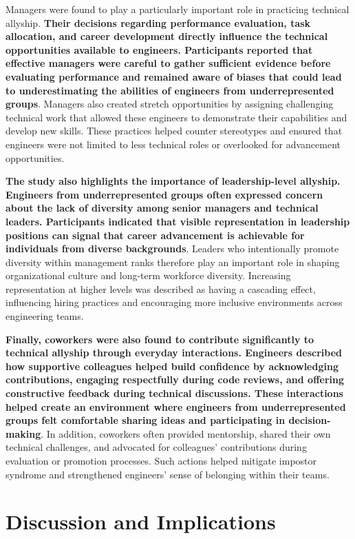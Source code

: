 Managers were found to play a particularly important role in practicing technical allyship. \textbf{Their decisions regarding performance evaluation, task allocation, and career development directly influence the technical opportunities available to engineers. Participants reported that effective managers were careful to gather sufficient evidence before evaluating performance and remained aware of biases that could lead to underestimating the abilities of engineers from underrepresented groups}. Managers also created stretch opportunities by assigning challenging technical work that allowed these engineers to demonstrate their capabilities and develop new skills. These practices helped counter stereotypes and ensured that engineers were not limited to less technical roles or overlooked for advancement opportunities.

\textbf{The study also highlights the importance of leadership-level allyship. Engineers from underrepresented groups often expressed concern about the lack of diversity among senior managers and technical leaders. Participants indicated that visible representation in leadership positions can signal that career advancement is achievable for individuals from diverse backgrounds}. Leaders who intentionally promote diversity within management ranks therefore play an important role in shaping organizational culture and long-term workforce diversity. Increasing representation at higher levels was described as having a cascading effect, influencing hiring practices and encouraging more inclusive environments across engineering teams.

\textbf{Finally, coworkers were also found to contribute significantly to technical allyship through everyday interactions. Engineers described how supportive colleagues helped build confidence by acknowledging contributions, engaging respectfully during code reviews, and offering constructive feedback during technical discussions. These interactions helped create an environment where engineers from underrepresented groups felt comfortable sharing ideas and participating in decision-making}. In addition, coworkers often provided mentorship, shared their own technical challenges, and advocated for colleagues’ contributions during evaluation or promotion processes. Such actions helped mitigate impostor syndrome and strengthened engineers’ sense of belonging within their teams.

\section{Discussion and Implications}
